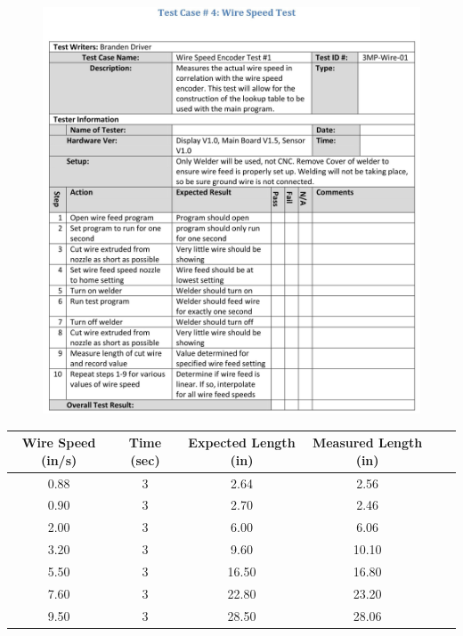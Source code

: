 \documentclass[12pt]{article}
\begin{document}
\begin{figure}[h!]
\centering
\includegraphics[scale=0.9]{tp-4}
\end{figure}

\clearpage

\begin{center}


\begin{tabular}{ |c|c|c|c|c|c| }


  \hline
  \textbf{Wire Speed (in/s)} & \textbf{Time (sec)} & \textbf{Expected Length (in)} & \textbf{Measured Length (in)} \\ \hline
  0.88 & 3 & 2.64 & 2.56 \\ \hline
  0.90 & 3 & 2.70 & 2.46 \\ \hline
  2.00 & 3 & 6.00 & 6.06 \\ \hline
  3.20 & 3 & 9.60 & 10.10 \\ \hline
  5.50 & 3 & 16.50 & 16.80 \\ \hline
    7.60 & 3 & 22.80 & 23.20 \\ \hline
      9.50 & 3 & 28.50 & 28.06 \\ \hline
      

  
\end{tabular}




\end{center}
\end{document}
